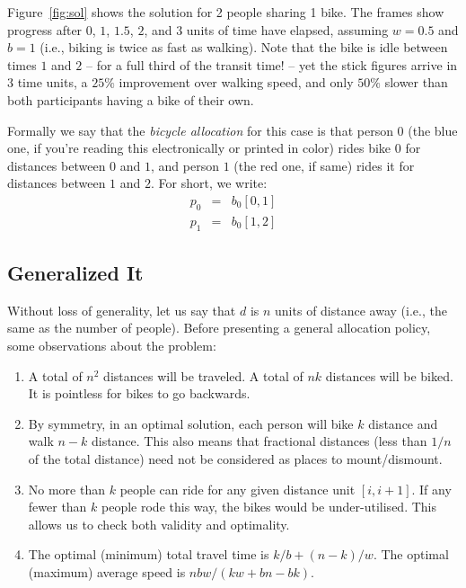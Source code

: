 \documentclass[DIV=calc, paper=a4, fontsize=11pt, twocolumn]{scrartcl}	 %
\begin{document}
Figure~\ref{fig:sol} shows the solution for 2 people sharing 1 bike.
The frames show progress after $0$, $1$, $1.5$, $2$, and $3$ units of time have elapsed, assuming $w=0.5$ and $b=1$ (i.e., biking is twice as fast as walking).
Note that the bike is idle between times $1$ and $2$ -- for a full third of the transit time! -- yet the stick figures arrive in $3$ time units, a $25\%$ improvement over walking speed, and only $50\%$ slower than both participants having a bike of their own.

Formally we say that the {\em bicycle allocation} for this case is that person $0$ (the blue one, if you're reading this electronically or printed in color) rides bike $0$ for distances between $0$ and $1$, and person $1$ (the red one, if same) rides it for distances between $1$ and $2$. For short, we write:
\begin{eqnarray*}
	p_0 &=& b_0[0,1] \\
	p_1 &=& b_0[1,2]
\end{eqnarray*}

\subsection{Generalized It}

Without loss of generality, let us say that $d$ is $n$ units of distance away (i.e., the same as the number of people).
Before presenting a general allocation policy, some observations about the problem:
\begin{enumerate}
	\setlength{\itemsep}{-0.5em}
	\item A total of $n^2$ distances will be traveled. A total of $nk$ distances will be biked. It is pointless for bikes to go backwards.
	\item By symmetry, in an optimal solution, each person will bike $k$ distance and walk $n-k$ distance. This also means that fractional distances (less than $1/n$ of the total distance) need not be considered as places to mount/dismount.
	\item No more than $k$ people can ride for any given distance unit $[i,i+1]$. If any fewer than $k$ people rode this way, the bikes would be under-utilised. This allows us to check both validity and optimality.
	\item The optimal (minimum) total travel time is $k/b + (n-k)/w$. The optimal (maximum) average speed is $nbw/(kw+bn-bk)$.
\end{enumerate}
\end{document}
